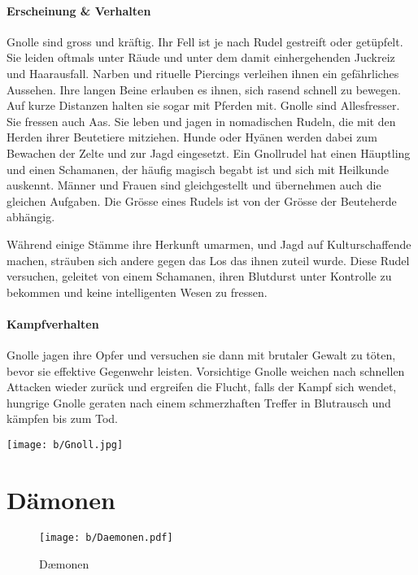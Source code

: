 \documentclass[10pt,twoside,twocolumn,openany]{book}
\begin{document}
\begin{multicols}{2}
		\paragraph{Erscheinung \& Verhalten}
		Gnolle sind gross und kräftig. Ihr Fell ist je nach Rudel gestreift oder getüpfelt. Sie leiden oftmals unter Räude und unter dem damit einhergehenden Juckreiz und Haarausfall. Narben und rituelle Piercings verleihen ihnen ein gefährliches Aussehen. Ihre langen Beine erlauben es ihnen, sich rasend schnell zu bewegen. Auf kurze Distanzen  halten sie sogar mit Pferden mit.
		Gnolle sind Allesfresser. Sie fressen auch Aas. Sie leben und jagen in nomadischen Rudeln, die mit den Herden ihrer Beutetiere mitziehen. Hunde oder Hyänen werden dabei zum Bewachen der Zelte und zur Jagd eingesetzt.
		Ein Gnollrudel hat einen Häuptling und einen Schamanen, der häufig magisch begabt ist und sich mit Heilkunde auskennt. Männer und Frauen sind gleichgestellt und übernehmen auch die gleichen Aufgaben. Die Grösse eines Rudels ist von der Grösse der Beuteherde abhängig.
		
		Während einige Stämme ihre Herkunft umarmen, und Jagd auf Kulturschaffende machen, sträuben sich andere gegen das Los das ihnen zuteil wurde. Diese Rudel versuchen, geleitet von einem Schamanen, ihren Blutdurst unter Kontrolle zu bekommen und keine intelligenten Wesen zu fressen.
		
		\paragraph{Kampfverhalten}
		Gnolle jagen ihre Opfer und versuchen sie dann mit brutaler Gewalt zu töten, bevor sie effektive Gegenwehr leisten. Vorsichtige Gnolle weichen nach schnellen Attacken wieder zurück und ergreifen die Flucht, falls der Kampf sich wendet, hungrige Gnolle geraten nach einem schmerzhaften Treffer in Blutrausch und kämpfen bis zum Tod.
		
		\texttt{[image: b/Gnoll.jpg]}
\end{multicols}

\newpage \section{Dämonen}

\begin{figure*}[htpb]
	\centering
	\texttt{[image: b/Daemonen.pdf]}
	\caption{D\ae monen}
\end{figure*}
\end{document}
